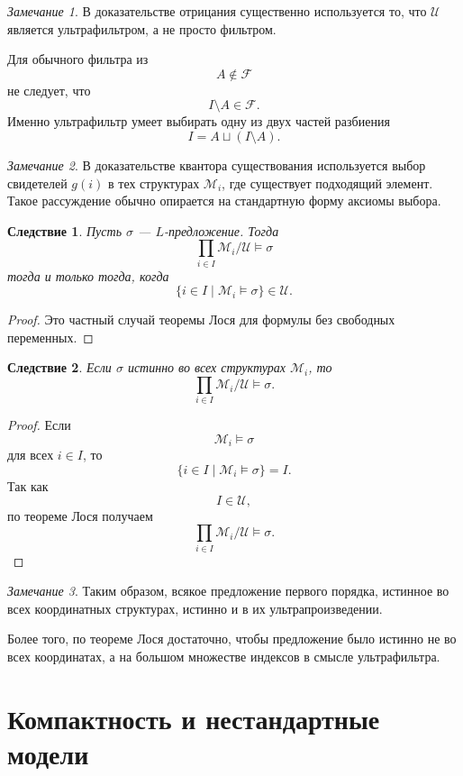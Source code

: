 \documentclass[12pt,a4paper,oneside,openany]{book}
\theoremstyle{definition}
\theoremstyle{plain}
\newtheorem{corollary}{Следствие}[chapter]
\theoremstyle{remark}
\newtheorem{remark}{Замечание}[chapter]
\begin{document}
\begin{remark}
В доказательстве отрицания существенно используется то, что $\mathcal U$ является ультрафильтром, а не просто фильтром.

Для обычного фильтра из
\[
A\notin\mathcal F
\]
не следует, что
\[
I\setminus A\in\mathcal F.
\]
Именно ультрафильтр умеет выбирать одну из двух частей разбиения
\[
I=A\sqcup(I\setminus A).
\]
\end{remark}

\begin{remark}
В доказательстве квантора существования используется выбор свидетелей $g(i)$ в тех структурах $\mathcal M_i$, где существует подходящий элемент. Такое рассуждение обычно опирается на стандартную форму аксиомы выбора.
\end{remark}


\begin{corollary}
Пусть $\sigma$ — $L$-предложение. Тогда
\[
\prod_{i\in I}\mathcal M_i/\mathcal U\models\sigma
\]
тогда и только тогда, когда
\[
\{i\in I\mid \mathcal M_i\models\sigma\}\in\mathcal U.
\]
\end{corollary}

\begin{proof}
Это частный случай теоремы Лося для формулы без свободных переменных.
\end{proof}

\begin{corollary}
Если $\sigma$ истинно во всех структурах $\mathcal M_i$, то
\[
\prod_{i\in I}\mathcal M_i/\mathcal U\models\sigma.
\]
\end{corollary}

\begin{proof}
Если
\[
\mathcal M_i\models\sigma
\]
для всех $i\in I$, то
\[
\{i\in I\mid \mathcal M_i\models\sigma\}=I.
\]
Так как
\[
I\in\mathcal U,
\]
по теореме Лося получаем
\[
\prod_{i\in I}\mathcal M_i/\mathcal U\models\sigma.
\]
\end{proof}

\begin{remark}
Таким образом, всякое предложение первого порядка, истинное во всех координатных структурах, истинно и в их ультрапроизведении.

Более того, по теореме Лося достаточно, чтобы предложение было истинно не во всех координатах, а на большом множестве индексов в смысле ультрафильтра.
\end{remark}


\section{Компактность и нестандартные модели}
\end{document}
